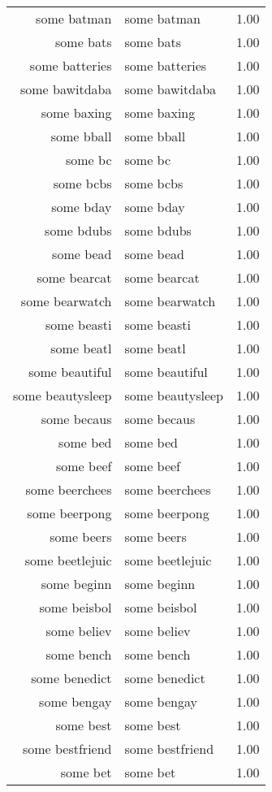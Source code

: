 \begin{table}[ht]
\begin{tabular}{rlr}
  some batman & some batman & 1.00 \\ 
  some bats & some bats & 1.00 \\ 
  some batteries & some batteries & 1.00 \\ 
  some bawitdaba & some bawitdaba & 1.00 \\ 
  some baxing & some baxing & 1.00 \\ 
  some bball & some bball & 1.00 \\ 
  some bc & some bc & 1.00 \\ 
  some bcbs & some bcbs & 1.00 \\ 
  some bday & some bday & 1.00 \\ 
  some bdubs & some bdubs & 1.00 \\ 
  some bead & some bead & 1.00 \\ 
  some bearcat & some bearcat & 1.00 \\ 
  some bearwatch & some bearwatch & 1.00 \\ 
  some beasti & some beasti & 1.00 \\ 
  some beatl & some beatl & 1.00 \\ 
  some beautiful & some beautiful & 1.00 \\ 
  some beautysleep & some beautysleep & 1.00 \\ 
  some becaus & some becaus & 1.00 \\ 
  some bed & some bed & 1.00 \\ 
  some beef & some beef & 1.00 \\ 
  some beerchees & some beerchees & 1.00 \\ 
  some beerpong & some beerpong & 1.00 \\ 
  some beers & some beers & 1.00 \\ 
  some beetlejuic & some beetlejuic & 1.00 \\ 
  some beginn & some beginn & 1.00 \\ 
  some beisbol & some beisbol & 1.00 \\ 
  some believ & some believ & 1.00 \\ 
  some bench & some bench & 1.00 \\ 
  some benedict & some benedict & 1.00 \\ 
  some bengay & some bengay & 1.00 \\ 
  some best & some best & 1.00 \\ 
  some bestfriend & some bestfriend & 1.00 \\ 
  some bet & some bet & 1.00 \\ 

\end{tabular}
\end{table}
